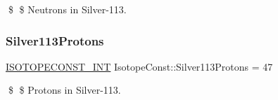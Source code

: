 \$ \$ Neutrons in Silver-\/113. \mbox{\label{group___isotope_const-_silver-_ag113_ga62ba04b8e6e0e695353381f40dce3953}} 
\subsubsection{\texorpdfstring{Silver113\+Protons}{Silver113Protons}}
{\footnotesize\ttfamily \mbox{\hyperlink{group___isotope_const-_macros_ga5f18360b3e99483a35c32d789e62621c}{I\+S\+O\+T\+O\+P\+E\+C\+O\+N\+S\+T\+\_\+\+I\+NT}} Isotope\+Const\+::\+Silver113\+Protons = 47}

\$ \$ Protons in Silver-\/113. 